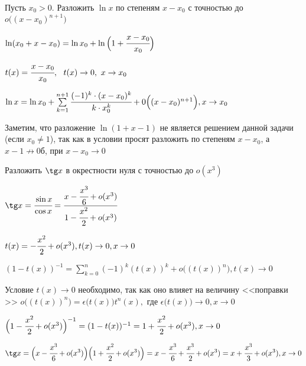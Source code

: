 \begin{problem}
	Пусть $x_{0} > 0.$ Разложить $\ln x$ по степеням $x-x_{0}$ с точностью до $o\Big((x-x_{0})^{n+1}\Big)$
\end{problem}
\begin{solution}
	$\ln (x_{0} + x - x_{0}) = \ln x_{0} + \ln \Big(1 + \cfrac{x-x_{0}}{x_{0}} \Big)$
	
	$t(x) =  \cfrac{x-x_{0}}{x_{0}} , \ \ t(x) \to 0, \ x\to x_{0}$
	
	$ \ln x = \ln x_{0} + \sum\limits_{k = 1}^{n + 1} \cfrac{(-1)^{k} \cdot (x-x_{0})^{k}}{k\cdot x_{0}^{k}} + 0\Big((x-x_{0})^{n+1}\Big), x\to x_{0} $
\end{solution}
\begin{note}
	Заметим, что разложение $\ln (1 + x - 1)$ не является решением данной задачи (если $x_{0} \neq 1$), так как в условии просят разложить по степеням  $x-x_{0}$, а $x-1 \not \to 0б$, при $x-x_{0} \to 0$
\end{note}

\begin{problem}
	Разложить $ \tg x$ в окрестности нуля с точностью до $o(x^{3})$
\end{problem}
\begin{solution}
	$\tg x = \cfrac{\sin x}{\cos x} = \cfrac{x - \cfrac{x^{3}}{6} + o(x^{3})}{1 - \cfrac{x^{2}}{2} + o(x^{3})}$
	
	$t(x) = -\cfrac{x^{2}}{2} + o(x^{3}), t(x) \to 0, x\to 0 $
	
	$(1-t(x))^{-1} = \sum\limits_{k = 0}^{n} (-1)^{k} (t(x))^{k} + o\Big((t(x))^{n}\Big), t(x)\to 0$
	
	Условие  $ t(x) \to 0$ необходимо, так как оно влияет на величину <<поправки >> $o\Big((t(x))^{n}\Big) = \epsilon\Big(t(x)\Big)t^{n}(x),$ где $ \epsilon\Big(t(x)\Big) \to 0, x\to 0$
	
	$\Big(1 - \cfrac{x^{2}}{2} + o(x^{3})\Big)^{-1} = (1-t(x))^{-1} = 1 + \cfrac{x^{2}}{2} + o(x^{3}), x\to 0 $
	
	$$\tg x = \Big(x - \cfrac{x^{3}}{6} + o(x^{3})\Big)\Big(1 + \cfrac{x^{2}}{2} + o(x^{3})\Big) = x-\cfrac{x^{3}}{6} + \cfrac{x^{3}}{2} + o(x^{3}) = x + \cfrac{x^{3}}{3} +  o(x^{3}), x\to 0 $$
\end{solution}
